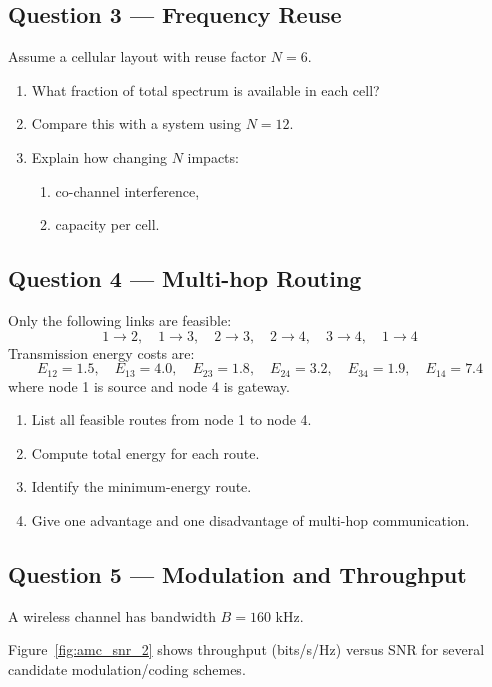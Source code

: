 \documentclass[11pt,a4paper]{article}
\begin{document}
\subsection*{Question 3 --- Frequency Reuse}
Assume a cellular layout with reuse factor $N=6$.

\begin{enumerate}[label=\alph*)]
    \item What fraction of total spectrum is available in each cell?
    \item Compare this with a system using $N=12$.
    \item Explain how changing $N$ impacts:
    \begin{enumerate}[label=\roman*)]
        \item co-channel interference,
        \item capacity per cell.
    \end{enumerate}
\end{enumerate}

\subsection*{Question 4 --- Multi-hop Routing}
Only the following links are feasible:
\[
1 \rightarrow 2,\quad 1 \rightarrow 3,\quad 2 \rightarrow 3,\quad 2 \rightarrow 4,\quad 3 \rightarrow 4,\quad 1 \rightarrow 4
\]
Transmission energy costs are:
\[
E_{12}=1.5,\quad E_{13}=4.0,\quad E_{23}=1.8,\quad E_{24}=3.2,\quad E_{34}=1.9,\quad E_{14}=7.4
\]
where node 1 is source and node 4 is gateway.

\begin{enumerate}[label=\alph*)]
    \item List all feasible routes from node 1 to node 4.
    \item Compute total energy for each route.
    \item Identify the minimum-energy route.
    \item Give one advantage and one disadvantage of multi-hop communication.
\end{enumerate}

\subsection*{Question 5 --- Modulation and Throughput}
A wireless channel has bandwidth $B = 160$ kHz.

Figure~\ref{fig:amc_snr_2} shows throughput (bits/s/Hz) versus SNR for several candidate modulation/coding schemes.

\FloatBarrier
\end{document}
